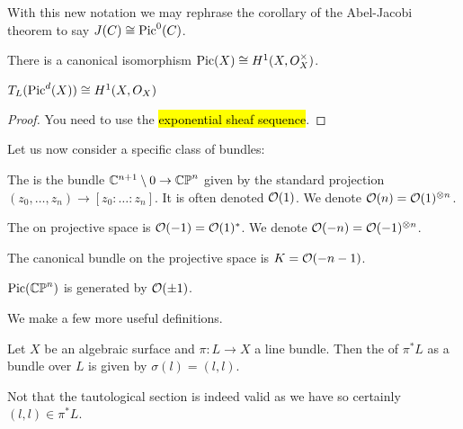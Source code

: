 \documentclass{article}
\begin{document}
\begin{remark}
	With this new notation we may rephrase the corollary of the Abel-Jacobi theorem to say $J(C) \cong \operatorname{Pic}^0(C)$. 
\end{remark}

\begin{prop}
	There is a canonical isomorphism $\operatorname{Pic}(X) \cong H^1(X, O_X^\times)$. 
\end{prop}
\begin{corollary}
	$T_L(\operatorname{Pic}^d(X)) \cong H^1(X,O_X)$
\end{corollary}
\begin{proof}
	You need to use the \hl{exponential sheaf sequence}. 
\end{proof}

Let us now consider a specific class of bundles: 

\begin{definition}
	The  is the bundle $\mathbb{C}^{n+1}\setminus 0 \to \mathbb{CP}^n$ given by the standard projection $(z_0, \dots, z_n) \to [z_0: \dots : z_n]$. It is often denoted $\mathcal{O}(1)$.  We denote $\mathcal{O}(n) = \mathcal{O}(1)^{\otimes n}$.
\end{definition}



\begin{definition}
	The  on projective space is $\mathcal{O}(-1) = \mathcal{O}(1)^\ast$. We denote $\mathcal{O}(-n) = \mathcal{O}(-1)^{\otimes n}$. 
\end{definition}

\begin{prop}
	The canonical bundle on the projective space is $K = \mathcal{O}(-n-1)$. 
\end{prop}
\begin{prop}
	$\operatorname{Pic}(\mathbb{CP}^n)$ is generated by $\mathcal{O}(\pm1)$.  
\end{prop}

We make a few more useful definitions. 

\begin{definition}
	Let $X$ be an algebraic surface and $\pi:L \to X$ a line bundle. Then the  of $\pi^\ast L$ as a bundle over $L$ is given by $\sigma(l) = (l,l)$. 
\end{definition}

\begin{remark}
	Not that the tautological section is indeed valid as we have 
so certainly $(l,l) \in \pi^\ast L$. 
\end{remark}
\end{document}
